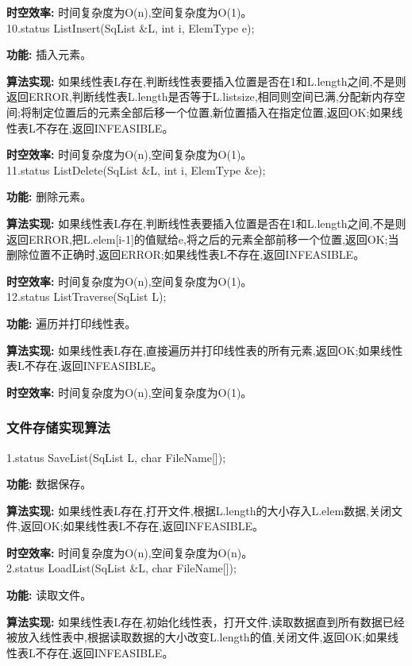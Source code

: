 \documentclass[supercite]{Experimental_Report}
\theoremstyle{definition}
\begin{document}
\textbf{时空效率: }时间复杂度为O(n),空间复杂度为O(1)。\\

10.status ListInsert(SqList \&L, int i, ElemType e);

\textbf{功能: }插入元素。

\textbf{算法实现: }如果线性表L存在,判断线性表要插入位置是否在1和L.length之间,不是则返回ERROR,判断线性表L.length是否等于L.listsize,相同则空间已满,分配新内存空间;将制定位置后的元素全部后移一个位置,新位置插入在指定位置,返回OK;如果线性表L不存在,返回INFEASIBLE。

\textbf{时空效率: }时间复杂度为O(n),空间复杂度为O(1)。\\

11.status ListDelete(SqList \&L, int i, ElemType \&e);

\textbf{功能: }删除元素。

\textbf{算法实现: }如果线性表L存在,判断线性表要插入位置是否在1和L.length之间,不是则返回ERROR,把L.elem[i-1]的值赋给e,将之后的元素全部前移一个位置,返回OK;当删除位置不正确时,返回ERROR;如果线性表L不存在,返回INFEASIBLE。

\textbf{时空效率: }时间复杂度为O(n),空间复杂度为O(1)。\\

12.status ListTraverse(SqList L);

\textbf{功能: }遍历并打印线性表。

\textbf{算法实现: }如果线性表L存在,直接遍历并打印线性表的所有元素,返回OK;如果线性表L不存在,返回INFEASIBLE。

\textbf{时空效率: }时间复杂度为O(n),空间复杂度为O(1)。\\

\subsubsection{文件存储实现算法}

1.status SaveList(SqList L, char FileName[]);

\textbf{功能: }数据保存。

\textbf{算法实现: }如果线性表L存在,打开文件,根据L.length的大小存入L.elem数据,关闭文件,返回OK;如果线性表L不存在,返回INFEASIBLE。

\textbf{时空效率: }时间复杂度为O(n),空间复杂度为O(n)。\\

2.status LoadList(SqList \&L, char FileName[]);

\textbf{功能: }读取文件。

\textbf{算法实现: }如果线性表L存在,初始化线性表，打开文件,读取数据直到所有数据已经被放入线性表中,根据读取数据的大小改变L.length的值,关闭文件,返回OK;如果线性表L不存在,返回INFEASIBLE。
\end{document}
